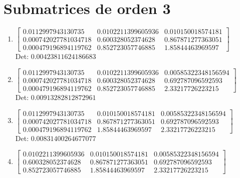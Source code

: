 \documentclass[12pt]{article}
\begin{document}
\section*{Submatrices de orden 3}

\begin{enumerate}

\item $\displaystyle \left[\begin{matrix}0.0112997943130735 & 0.0102211399605936 & 0.010150018574181\\0.000742027781034718 & 0.600328052374628 & 0.867871277363051\\0.000479196894119762 & 0.852723057746885 & 1.85844463969597\end{matrix}\right]$\\

Det: $0.00423811624186683$\\

\item $\displaystyle \left[\begin{matrix}0.0112997943130735 & 0.0102211399605936 & 0.00585322348156594\\0.000742027781034718 & 0.600328052374628 & 0.692787096592593\\0.000479196894119762 & 0.852723057746885 & 2.33217726223215\end{matrix}\right]$\\

Det: $0.00913282812872961$\\

\item $\displaystyle \left[\begin{matrix}0.0112997943130735 & 0.010150018574181 & 0.00585322348156594\\0.000742027781034718 & 0.867871277363051 & 0.692787096592593\\0.000479196894119762 & 1.85844463969597 & 2.33217726223215\end{matrix}\right]$\\

Det: $0.00831400264677077$\\

\item $\displaystyle \left[\begin{matrix}0.0102211399605936 & 0.010150018574181 & 0.00585322348156594\\0.600328052374628 & 0.867871277363051 & 0.692787096592593\\0.852723057746885 & 1.85844463969597 & 2.33217726223215\end{matrix}\right]$\\


\end{enumerate}
\end{document}
